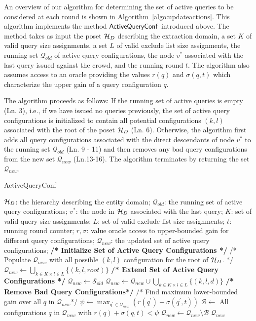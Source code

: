 An overview of our algorithm for determining the set of active queries to be considered at each round is shown in Algorithm~\ref{algo:updateactions}. This algorithm implements the method ${\sf ActiveQueryConf}$ introduced above. The method takes as input the poset $\mathcal{H}_D$ describing the extraction domain, a set $K$ of valid query size assignments, a set $L$ of valid exclude list size assignments, the running set $\mathcal{Q}_{old}$ of active query configurations, the node $v^*$ associated with the last query issued against the crowd, and the running round $t$. The algorithm also assumes access to an oracle providing the values $r(q)$ and $\sigma(q,t)$  which characterize the upper gain of a query configuration $q$.

The algorithm proceeds as follows: If the running set of active queries is empty (Ln. 3), i.e., if we have issued no queries previously, the set of active query configurations is initialized to contain all potential configurations $(k,l)$ associated with the root of the poset $\mathcal{H}_D$ (Ln. 6). Otherwise, the algorithm first adds all query configurations associated with the direct descendants of node $v^*$ to the running set $\mathcal{Q}_{old}$ (Ln. 9 - 11) and then removes any bad query configurations from the new set $\mathcal{Q}_{new}$ (Ln.13-16). The algorithm terminates by returning the set $\mathcal{Q}_{new}$.

\begin{algorithm}[h]
\small\caption{ActiveQueryConf}
\label{algo:updateactions}
\begin{algorithmic}[1]
 $\mathcal{H}_D$: the hierarchy describing the entity domain; $\mathcal{Q}_{old}$: the running set of active query configurations; $v^*$: the node in $\mathcal{H}_D$ associated with the last query; $K$: set of valid query size assignments; $L$: set of valid exclude-list size assignments; $t$: running round counter; $r,\sigma$: value oracle access to upper-bounded gain for different query configurations;
 $\mathcal{Q}_{new}$: the updated set of active query configurations;
	\STATE \textbf{/* Initialize Set of Active Query Configurations */}
	\STATE /* Populate ${\mathcal{Q}_{new}}$ with all possible $(k,l)$ configuration for the root of $\mathcal{H}_D$. */
	\STATE ${\mathcal{Q}_{new}} \leftarrow \bigcup_{k \in K \times l \in L} \{ (k,l,root) \}$
\ELSE
	\STATE \textbf{/* Extend Set of Active Query Configurations */}
	\STATE $\mathcal{Q}_{new} \leftarrow \mathcal{S}_{old}$
	\STATE $\mathcal{Q}_{new} \leftarrow \mathcal{Q}_{new} \cup \bigcup_{k \in K \times l \in L} \{(k,l,d)\}$
	\ENDFOR
	\STATE \textbf{/* Remove Bad Query Configurations*/}
	\STATE /* Find maximum lower-bounded gain over all $q$ in $\mathcal{Q}_{new}$*/
	\STATE $\psi \leftarrow \max_{q^{\prime} \in \mathcal{Q}_{new}} (r(q^{\prime}) - \sigma(q^{\prime},t))$  
	\STATE $\mathcal{B} \leftarrow$ All configurations $q$ in $\mathcal{Q}_{new}$ with $r(q) + \sigma(q,t) < \psi$
	\STATE $\mathcal{Q}_{new} \leftarrow \mathcal{Q}_{new} \setminus \mathcal{B}$
\ENDIF 
\RETURN $\mathcal{Q}_{new}$
\end{algorithmic}
\end{algorithm}
\vspace{-5pt}
